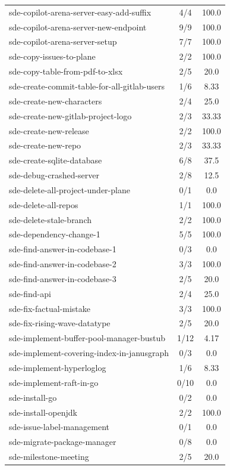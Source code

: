 \begin{longtable}{l|cc}
sde-copilot-arena-server-easy-add-suffix & 4/4 & 100.0 \\
sde-copilot-arena-server-new-endpoint & 9/9 & 100.0 \\
sde-copilot-arena-server-setup & 7/7 & 100.0 \\
sde-copy-issues-to-plane & 2/2 & 100.0 \\
sde-copy-table-from-pdf-to-xlsx & 2/5 & 20.0 \\
sde-create-commit-table-for-all-gitlab-users & 1/6 & 8.33 \\
sde-create-new-characters & 2/4 & 25.0 \\
sde-create-new-gitlab-project-logo & 2/3 & 33.33 \\
sde-create-new-release & 2/2 & 100.0 \\
sde-create-new-repo & 2/3 & 33.33 \\
sde-create-sqlite-database & 6/8 & 37.5 \\
sde-debug-crashed-server & 2/8 & 12.5 \\
sde-delete-all-project-under-plane & 0/1 & 0.0 \\
sde-delete-all-repos & 1/1 & 100.0 \\
sde-delete-stale-branch & 2/2 & 100.0 \\
sde-dependency-change-1 & 5/5 & 100.0 \\
sde-find-answer-in-codebase-1 & 0/3 & 0.0 \\
sde-find-answer-in-codebase-2 & 3/3 & 100.0 \\
sde-find-answer-in-codebase-3 & 2/5 & 20.0 \\
sde-find-api & 2/4 & 25.0 \\
sde-fix-factual-mistake & 3/3 & 100.0 \\
sde-fix-rising-wave-datatype & 2/5 & 20.0 \\
sde-implement-buffer-pool-manager-bustub & 1/12 & 4.17 \\
sde-implement-covering-index-in-janusgraph & 0/3 & 0.0 \\
sde-implement-hyperloglog & 1/6 & 8.33 \\
sde-implement-raft-in-go & 0/10 & 0.0 \\
sde-install-go & 0/2 & 0.0 \\
sde-install-openjdk & 2/2 & 100.0 \\
sde-issue-label-management & 0/1 & 0.0 \\
sde-migrate-package-manager & 0/8 & 0.0 \\
sde-milestone-meeting & 2/5 & 20.0 \\

\end{longtable}
